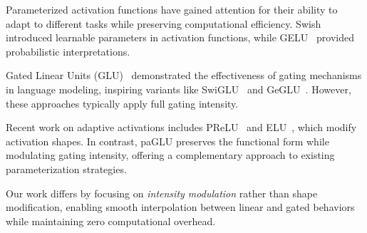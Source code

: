 Parameterized activation functions have gained attention for their ability to adapt to different tasks while preserving computational efficiency. Swish~\cite{ramachandran2017searching} introduced learnable parameters in activation functions, while GELU~\cite{hendrycks2016gaussian} provided probabilistic interpretations. 

Gated Linear Units (GLU)~\cite{dauphin2017language} demonstrated the effectiveness of gating mechanisms in language modeling, inspiring variants like SwiGLU~\cite{shazeer2020glu} and GeGLU~\cite{shazeer2020glu}. However, these approaches typically apply full gating intensity.

Recent work on adaptive activations includes PReLU~\cite{he2015delving} and ELU~\cite{clevert2015fast}, which modify activation shapes. In contrast, paGLU preserves the functional form while modulating gating intensity, offering a complementary approach to existing parameterization strategies.

Our work differs by focusing on \emph{intensity modulation} rather than shape modification, enabling smooth interpolation between linear and gated behaviors while maintaining zero computational overhead. 
